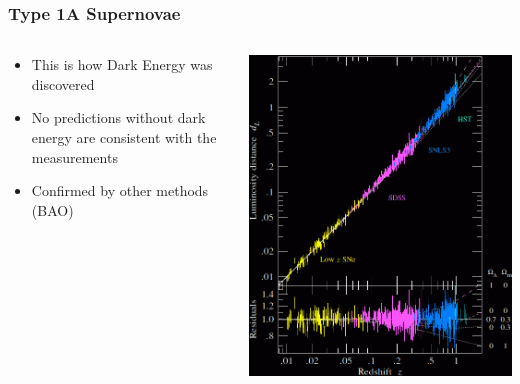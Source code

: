 \documentclass{beamer}
\begin{document}
{

    \frametitle{Type 1A Supernovae}


    \begin{columns}
        \begin{column}{0.5\textwidth}
            \begin{itemize}

                \item This is how Dark Energy was discovered 

                \item No predictions without dark energy are consistent
                    with the measurements

                \item Confirmed by other methods (BAO)

            \end{itemize}

        \end{column}
        \begin{column}{0.5\textwidth}
            \begin{center}
                \includegraphics[width=\textwidth]{snhubblediag_betoule_inv.png}
            \end{center}
        \end{column}

    \end{columns}


}
\end{document}
